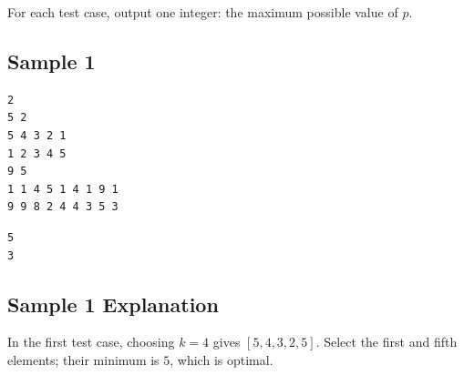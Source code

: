 For each test case, output one integer: the maximum possible value of $p$.

\subsection{Sample 1}

\begin{minipage}{\linewidth}
	\begin{minipage}[t]{0.49\linewidth}
		\begin{lstlisting}[title=\texttt{standard input}]	
2
5 2
5 4 3 2 1
1 2 3 4 5
9 5
1 1 4 5 1 4 1 9 1
9 9 8 2 4 4 3 5 3
\end{lstlisting}
	\end{minipage}
	\begin{minipage}[t]{0.49\linewidth}
		\begin{lstlisting}[title=\texttt{standard output}]
5
3
\end{lstlisting}
	\end{minipage}
\end{minipage}

\subsection{Sample 1 Explanation}

In the first test case, choosing $k=4$ gives $[5,4,3,2,5]$. Select the first and fifth elements; their minimum is $5$, which is optimal.
